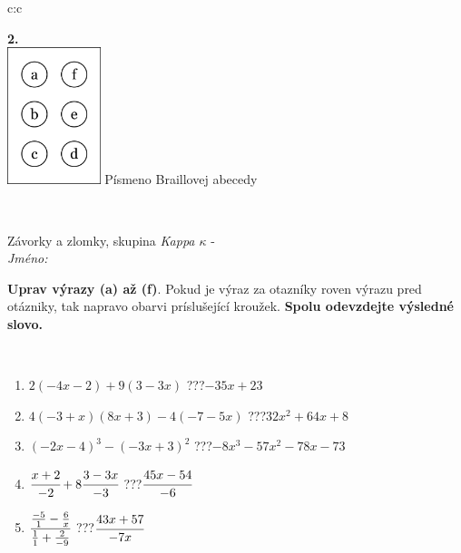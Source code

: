 \documentclass[10pt]{report}
\begin{document}
\begin{tabular}{c:c}
\begin{minipage}[c][104.5mm][t]{0.5\linewidth}
\begin{center}
\begin{minipage}{0.20\linewidth}
\begin{center}
{\Huge\bfseries 2.} \\[2mm]
\includegraphics[height=40mm]{../images/braille.png}
{\small Písmeno Braillovej abecedy}
\end{center}
\end{minipage}
\end{center}
\end{minipage}
\\ \hdashline
\begin{minipage}[c][104.5mm][t]{0.5\linewidth}
\begin{center}
\vspace{7mm}
{\huge Závorky a zlomky, skupina \textit{Kappa $\kappa$} -}\\[5mm]
\textit{Jméno:}\phantom{xxxxxxxxxxxxxxxxxxxxxxxxxxxxxxxxxxxxxxxxxxxxxxxxxxxxxxxxxxxxxxxxx}\\[5mm]
\begin{minipage}{0.95\linewidth}
\begin{center}
\textbf{Uprav výrazy (a) až (f)}. Pokud je výraz za otazníky roven výrazu pred otázniky, tak napravo obarvi príslušející kroužek. \textbf{Spolu odevzdejte výsledné slovo.}
\end{center}
\end{minipage}
\\[1mm]
\begin{minipage}{0.79\linewidth}
\begin{center}
\begin{varwidth}{\linewidth}
\begin{enumerate}
\normalsize
\item $2(-4x-2)+9(3-3x)$\quad \dotfill\; ???\;\dotfill \quad $-35x+23$
\item $4(-3+x)(8x+3)-4(-7-5x)$\quad \dotfill\; ???\;\dotfill \quad $32x^2+64x+8$
\item $(-2x-4)^3-(-3x+3)^2$\quad \dotfill\; ???\;\dotfill \quad $-8x^3-57x^2-78x-73$
\item $\cfrac{x+2}{-2}+8\cfrac{3-3x}{-3}$\quad \dotfill\; ???\;\dotfill \quad $\cfrac{45x-54}{-6}$
\item $\cfrac{\frac{-5}{1}-\frac{6}{x}}{\frac{1}{1}+\frac{2}{-9}}$\quad \dotfill\; ???\;\dotfill \quad $\cfrac{43x+57}{-7x}$

\end{enumerate}
\end{varwidth}
\end{center}
\end{minipage}
\end{center}
\end{minipage}
\end{tabular}
\end{document}
